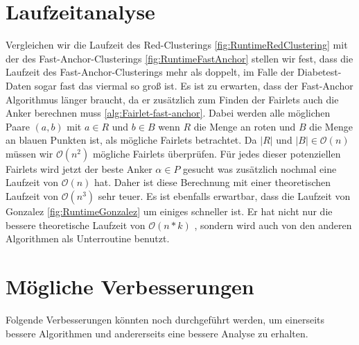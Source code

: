 \section{Laufzeitanalyse}
    Vergleichen wir die Laufzeit des Red-Clusterings \ref{fig:RuntimeRedClustering} mit der des Fast-Anchor-Clusterings \ref{fig:RuntimeFastAnchor} stellen wir fest, dass die Laufzeit des Fast-Anchor-Clusterings mehr als doppelt, im Falle der Diabetest-Daten \cite{misc_diabetes_130_richtig} sogar fast das viermal so groß ist. \newline
    Es ist zu erwarten, dass der Fast-Anchor Algorithmus länger braucht, da er zusätzlich zum Finden der Fairlets auch die Anker berechnen muss \ref{alg:Fairlet-fast-anchor}. Dabei werden alle möglichen Paare $(a,b)$ mit $a \in R$ und $b \in B$ wenn $R$ die Menge an roten und $B$ die Menge an blauen Punkten ist, als mögliche Fairlets betrachtet. Da $|R|$ und $|B| \in \mathcal{O}(n)$ müssen wir $\mathcal{O}(n^2)$ mögliche Fairlets überprüfen. Für jedes dieser potenziellen Fairlets wird jetzt der beste Anker $\alpha \in P$ gesucht was zusätzlich nochmal eine Laufzeit von $\mathcal{O}(n)$ hat. Daher ist diese Berechnung mit einer theoretischen Laufzeit von $\mathcal{O}(n^{3})$ sehr teuer. \newline
    Es ist ebenfalls erwartbar, dass die Laufzeit von Gonzalez \ref{fig:RuntimeGonzalez} um einiges schneller ist. Er hat nicht nur die bessere theoretische Laufzeit von $\mathcal{O}(n * k)$ \cite{GONZALEZ1985293}, sondern wird auch von den anderen Algorithmen als Unterroutine benutzt.


\section{Mögliche Verbesserungen}
    Folgende Verbesserungen könnten noch durchgeführt werden, um einerseits bessere Algorithmen und andererseits eine bessere Analyse zu erhalten.

